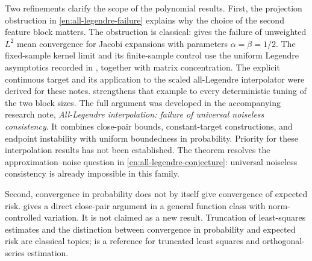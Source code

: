 \documentclass[11pt,twoside]{article}
\theoremstyle{definition}
\theoremstyle{remark}
\begin{document}
Two refinements clarify the scope of the polynomial results. First, the
projection obstruction in
\hyperlink{note:all-legendre-failure}{\cref*{en:all-legendre-failure}}
explains why the
choice of the second feature block matters. The obstruction is classical:
\citet[Theorem 2]{muckenhoupt1969} gives the failure of unweighted $L^2$
mean convergence for Jacobi expansions with parameters
$\alpha=\beta=1/2$. The fixed-sample kernel limit and its finite-sample
control use the uniform Legendre asymptotics recorded in
\citet[\S14.15(iii)]{nistdlmf}, together with matrix concentration.
The explicit continuous target and its application to the scaled
all-Legendre interpolator were derived for these notes.
 strengthens that example to every
deterministic tuning of the two block sizes. The full argument was developed
in the accompanying research note, \emph{All-Legendre interpolation:
failure of universal noiseless consistency}. It combines close-pair bounds,
constant-target constructions, and endpoint instability with uniform
boundedness in probability. Priority for these interpolation results has
not been established. The theorem resolves the approximation--noise
question in
\hyperlink{note:all-legendre-conjecture}{\cref*{en:all-legendre-conjecture}}:
universal noiseless consistency is already impossible in this family.

Second, convergence in probability does not by itself give convergence of
expected risk.  gives a direct close-pair
argument in a general function class with norm-controlled variation. It is
not claimed as a new result. Truncation of least-squares estimates and the
distinction between convergence in probability and expected risk are
classical topics; \citet[Chapters 10--11 and 18]{gyorfi2002} is a reference
for truncated least squares and orthogonal-series estimation.
\end{document}
